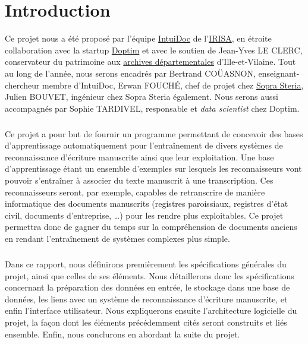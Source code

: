 \chapter{Introduction}
\setcounter{page}{1}
\pagestyle{fancy}
\fancyhf{}
\cfoot[\thepage]{\thepage}

Ce projet nous a été proposé par l’équipe \href{https://www-intuidoc.irisa.fr/}{IntuiDoc}
de l’\href{https://www.irisa.fr/}{IRISA}, en étroite collaboration avec la startup
\href{http://www.doptim.eu}{Doptim} et avec le soutien de Jean-Yves LE CLERC, conservateur du
patrimoine aux \href{http://archives.ille-et-vilaine.fr/fr}{archives départementales} d'Ille-et-Vilaine.
Tout au long de l’année, nous serons encadrés par Bertrand COÜASNON, enseignant-chercheur membre d'IntuiDoc,
Erwan FOUCHÉ, chef de projet chez \href{https://www.soprasteria.com/fr}{Sopra Steria}, Julien BOUVET,
ingénieur chez Sopra Steria également. Nous serons aussi accompagnés par Sophie TARDIVEL, responsable
et \textit{data scientist} chez Doptim.

\paragraph{}
Ce projet a pour but de fournir un programme permettant de concevoir des bases d’apprentissage
automatiquement pour l’entraînement de divers systèmes de reconnaissance d’écriture manuscrite
ainsi que leur exploitation. Une base d'apprentissage étant un ensemble
d'exemples sur lesquels les reconnaisseurs vont pouvoir s'entraîner à associer
du texte manuscrit à une transcription. Ces reconnaisseurs seront, par exemple,
capables de retranscrire de manière informatique des documents manuscrits
(registres paroissiaux, registres d’état civil, documents d’entreprise,
\ldots) pour les rendre plus exploitables. Ce projet permettra donc de gagner
du temps sur la compréhension de documents anciens en rendant l’entraînement
de systèmes complexes plus simple.

\paragraph{}
Dans ce rapport, nous définirons premièrement les spécifications générales du
projet, ainsi que celles de ses éléments. Nous détaillerons donc les
spécifications concernant la préparation des données en entrée, le stockage
dans une base de données, les liens avec un système de reconnaissance
d’écriture manuscrite, et enfin l’interface utilisateur. Nous expliquerons
ensuite l’architecture logicielle du projet, la façon dont les éléments
précédemment cités seront construits et liés ensemble. Enfin, nous conclurons
en abordant la suite du projet.
